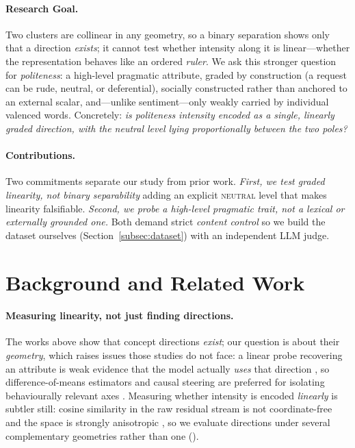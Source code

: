\documentclass{article}
\begin{document}
\paragraph{Research Goal.}
Two clusters are collinear in any geometry, so a binary separation shows only
that a direction \emph{exists}; it cannot test whether intensity along it is
linear---whether the representation behaves like an ordered \emph{ruler}. We ask
this stronger question for \emph{politeness}: a high-level pragmatic attribute,
graded by construction (a request can be rude, neutral, or deferential), socially
constructed rather than anchored to an external scalar, and---unlike
sentiment---only weakly carried by individual valenced words. Concretely:
\emph{is politeness intensity encoded as a single, linearly graded direction,
with the neutral level lying proportionally between the two poles?}


\paragraph{Contributions.}
Two commitments separate our study from prior work. \emph{First, we test graded linearity, not binary separability} adding an explicit \textsc{neutral} level that makes linearity falsifiable. \emph{Second, we probe a high-level pragmatic trait, not a lexical or externally grounded one.} Both demand strict \emph{content control} so we build the dataset ourselves (Section~\ref{subsec:dataset}) with an independent LLM judge.


\section{Background and Related Work}\label{sec:background}

\paragraph{Measuring linearity, not just finding directions.}
The works above show that concept directions \emph{exist}; our question
is about their \emph{geometry}, which raises issues those studies do not face: a linear probe recovering an attribute is weak
evidence that the model actually \emph{uses} that direction
\citep{belinkov2022,alain2016}, so difference-of-means estimators and causal steering are preferred for isolating behaviourally relevant
axes \citep{marks2024geometry,rimsky2024}. Measuring whether intensity is encoded
\emph{linearly} is subtler still: cosine similarity in the raw residual stream is
not coordinate-free \citep{park2024linear} and the space is strongly anisotropic
\citep{ethayarajh2019}, so we evaluate directions under several complementary
geometries rather than one ().
\end{document}
